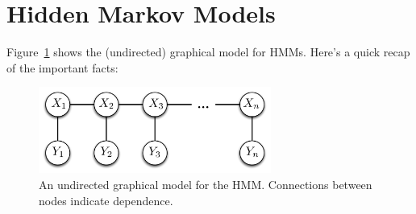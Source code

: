 \documentclass[12pt]{article}
\begin{document}
    \section*{Hidden Markov Models}
    Figure~\ref{fig:hmm} shows the (undirected) graphical model for
    HMMs. Here's a quick recap of the important facts:
    \begin{figure}[htpb]
        \centering
        \includegraphics[width=3in]{figs/hmm.pdf}
        \caption{An undirected graphical model for the HMM. Connections
            between nodes indicate dependence.}
        \label{fig:hmm}
    \end{figure}
\end{document}
